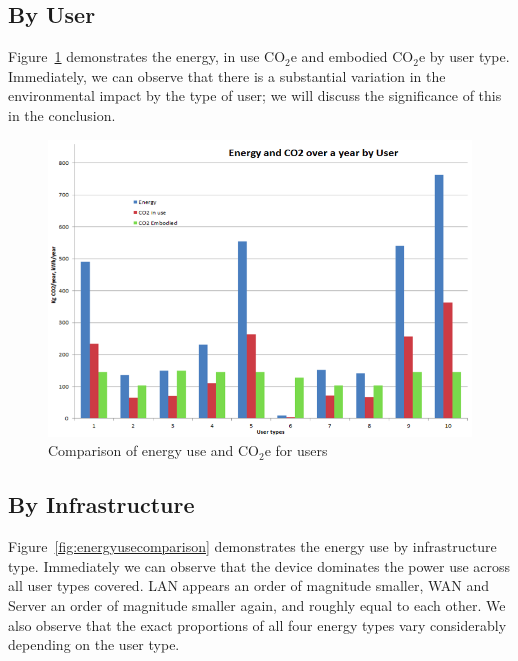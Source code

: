 \documentclass[conference]{IEEEtran}
\begin{document}
\subsection{By User}

Figure~\ref{fig:energyuse_co2e_overyearbyuser} demonstrates the
energy, in use CO$_2$e and embodied CO$_2$e by user type.  Immediately, we
can observe that there is a substantial variation in the environmental
impact by the type of user; we will discuss the significance of this
in the conclusion.

\begin{figure}[!htp]
\centering
\includegraphics[width=0.9\columnwidth]{images/energyuse_co2e_overyearbyuser.png}
\caption{Comparison of energy use and CO$_2$e for users}
\label{fig:energyuse_co2e_overyearbyuser} 
\end{figure}

\subsection{By Infrastructure}

Figure~\ref{fig:energyusecomparison} demonstrates the energy use by
infrastructure type. Immediately we can observe that the device
dominates the power use across all user types covered. LAN appears an
order of magnitude smaller, WAN and Server an order of magnitude
smaller again, and roughly equal to each other. We also observe that
the exact proportions of all four energy types vary considerably
depending on the user type.
\end{document}
